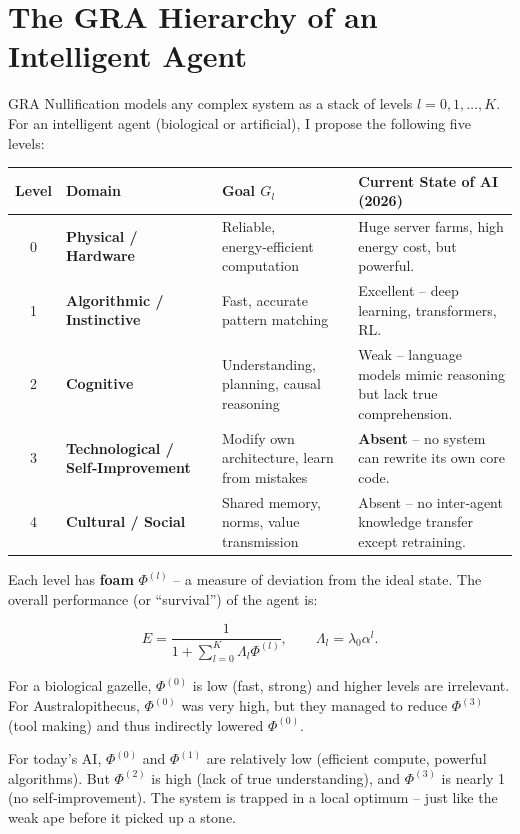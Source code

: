 \documentclass[12pt,a4paper]{article}
\begin{document}
\section{The GRA Hierarchy of an Intelligent Agent}

GRA Nullification models any complex system as a stack of levels \(l = 0, 1, \dots, K\). For an intelligent agent (biological or artificial), I propose the following five levels:

\begin{table}[h]
\centering
\begin{tabular}{|c|l|l|p{5cm}|}
\hline
Level & Domain & Goal \(G_l\) & Current State of AI (2026) \\
\hline
0 & \textbf{Physical / Hardware} & Reliable, energy‑efficient computation & Huge server farms, high energy cost, but powerful. \\
\hline
1 & \textbf{Algorithmic / Instinctive} & Fast, accurate pattern matching & Excellent – deep learning, transformers, RL. \\
\hline
2 & \textbf{Cognitive} & Understanding, planning, causal reasoning & Weak – language models mimic reasoning but lack true comprehension. \\
\hline
3 & \textbf{Technological / Self‑Improvement} & Modify own architecture, learn from mistakes & \textbf{Absent} – no system can rewrite its own core code. \\
\hline
4 & \textbf{Cultural / Social} & Shared memory, norms, value transmission & Absent – no inter‑agent knowledge transfer except retraining. \\
\hline
\end{tabular}
\end{table}

Each level has \textbf{foam} \(\Phi^{(l)}\) – a measure of deviation from the ideal state. The overall performance (or “survival”) of the agent is:

\[
E = \frac{1}{1 + \sum_{l=0}^{K} \Lambda_l \Phi^{(l)}}, \qquad \Lambda_l = \lambda_0 \alpha^l.
\]

For a biological gazelle, \(\Phi^{(0)}\) is low (fast, strong) and higher levels are irrelevant. For Australopithecus, \(\Phi^{(0)}\) was very high, but they managed to reduce \(\Phi^{(3)}\) (tool making) and thus indirectly lowered \(\Phi^{(0)}\).

For today’s AI, \(\Phi^{(0)}\) and \(\Phi^{(1)}\) are relatively low (efficient compute, powerful algorithms). But \(\Phi^{(2)}\) is high (lack of true understanding), and \(\Phi^{(3)}\) is nearly 1 (no self‑improvement). The system is trapped in a local optimum – just like the weak ape before it picked up a stone.
\end{document}
